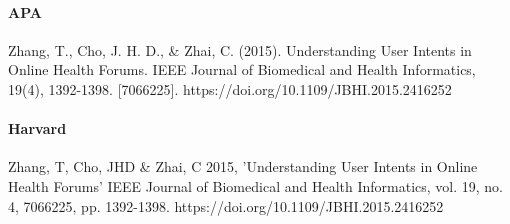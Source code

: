 \documentclass[11pt]{article}
\begin{document}
\paragraph{APA}

Zhang, T., Cho, J. H. D., \& Zhai, C. (2015). Understanding User Intents in Online Health Forums. IEEE Journal of Biomedical and Health Informatics, 19(4), 1392-1398. [7066225]. https://doi.org/10.1109/JBHI.2015.2416252

\paragraph{Harvard}

Zhang, T, Cho, JHD \& Zhai, C 2015, 'Understanding User Intents in Online Health Forums' IEEE Journal of Biomedical and Health Informatics, vol. 19, no. 4, 7066225, pp. 1392-1398. https://doi.org/10.1109/JBHI.2015.2416252
\end{document}
